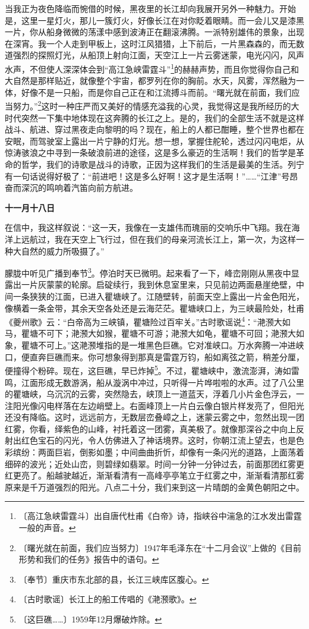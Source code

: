 \documentclass[12pt,UTF-8,openany]{ctexbook}
\begin{document}
\begin{large}
    当我正为夜色降临而惋借的时候，黑夜里的长江却向我展开另外一种魅力。开始是，这里一星灯火，那儿一簇灯火，好像长江在对你眨着眼睛。而一会儿又是漆黑一片，你从船身微微的荡漾中感到波涛正在翻滚沸腾。一派特别雄伟的景象，出现在深宵。我一个人走到甲板上，这时江风猎猎，上下前后，一片黑森森的，而无数道强烈的探照灯光，从船顶上射向江面，天空江上一片云雾迷蒙，电光闪闪，风声水声，不但使人深深体会到“高江急峡雷霆斗”\footnote{〔高江急峡雷霆斗〕出自唐代杜甫《白帝》诗，指峡谷中湍急的江水发出雷霆一般的声音。}的赫赫声势，而且你觉得你自己和大自然是那样贴近，就像整个宇宙，都罗列在你的胸前。水天，风雾，浑然融为一体，好像不是一只船，而是你自己正在和江流搏斗而前。“曙光就在前面，我们应当努力。”\footnote{〔曙光就在前面，我们应当努力〕1947年毛泽东在“十二月会议”上做的《目前形势和我们的任务》报告中的语句。}这时一种庄严而又美好的情感充溢我的心灵，我觉得这是我所经历的大时代突然一下集中地体现在这奔腾的长江之上。是的，我们的全部生活不就是这样战斗、航进、穿过黑夜走向黎明的吗？现在，船上的人都已酣睡，整个世界也都在安眠，而驾驶室上露出一片宁静的灯光。想一想，掌握住舵轮，透过闪闪电炬，从惊涛骇浪之中寻到一条破浪前进的途径，这是多么豪迈的生活啊！我们的哲学是革命的哲学，我们的诗歌是战斗的诗歌，正因为这样我们的生活是最美的生活。列宁有一句话说得好极了：“前进吧！这是多么好啊！这才是生活啊！”……“江津”号昂奋而深沉的鸣响着汽笛向前方航进。
    
    \textbf{十一月十八日}
    
    在信中，我这样叙说：“这一天，我像在一支雄伟而瑰丽的交响乐中飞翔。我在海洋上远航过，我在天空上飞行过，但在我们的母亲河流长江上，第一次，为这样一种大自然的威力所吸摄了。”
    
    朦胧中听见广播到奉节\footnote{〔奉节〕重庆市东北部的县，长江三峡库区腹心。}。停泊时天已微明。起来看了一下，峰峦刚刚从黑夜中显露出一片灰蒙蒙的轮廓。启碇续行，我到休息室里来，只见前边两面悬崖绝壁，中间一条狭狭的江面，已进入瞿塘峡了。江随壁转，前面天空上露出一片金色阳光，像横着一条金带，其余天空各处还是云海茫茫。瞿塘峡口上，为三峡最险处，杜甫《夔州歌》云：“白帝高为三峡镇，瞿塘险过百牢关。”古时歌谣说\footnote{〔古时歌谣〕长江上的船工传唱的《滟滪歌》。}：“滟滪大如马，瞿塘不可下；滟滪大如猴，瞿塘不可游；滟滪大如龟，瞿塘不可回；滟滪大如象，瞿塘不可上。”这滟滪堆指的是一堆黑色巨礁。它对准峡口。万水奔腾一冲进峡口，便直奔巨礁而来。你可想象得到那真是雷霆万钧，船如离弦之箭，稍差分厘，便撞得个粉碎。现在，这巨礁，早已炸掉\footnote{〔这巨礁……〕1959年12月爆破炸除。}。不过，瞿塘峡中，激流澎湃，涛如雷鸣，江面形成无数游涡，船从漩涡中冲过，只听得一片哗啦啦的水声。过了八公里的瞿塘峡，乌沉沉的云雾，突然隐去，峡顶上一道蓝天，浮着几小片金色浮云，一注阳光像闪电样落在左边峭壁上。右面峰顶上一片白云像白银片样发亮了，但阳光还没有降临。这时，远远前方，无数层峦叠嶂之上，迷蒙云雾之中，忽然出现一团红雾，你看，绎紫色的山峰，衬托着这一团雾，真美极了。就像那深谷之中向上反射出红色宝石的闪光，令人仿佛进入了神话境界。这时，你朝江流上望去，也是色彩缤纷：两面巨岩，倒影如墨；中间曲曲折忻，却像有一条闪光的道路，上面荡着细碎的波光；近处山峦，则碧绿如翡翠。时间一分钟一分钟过去，前面那团红雾更红更亮了。船越驶越近，渐渐看清有一高峰亭亭笔立于红雾之中，渐渐看清那红雾原来是千万道强烈的阳光。八点二十分，我们来到这一片晴朗的金黄色朝阳之中。
    

\end{large}
\end{document}
